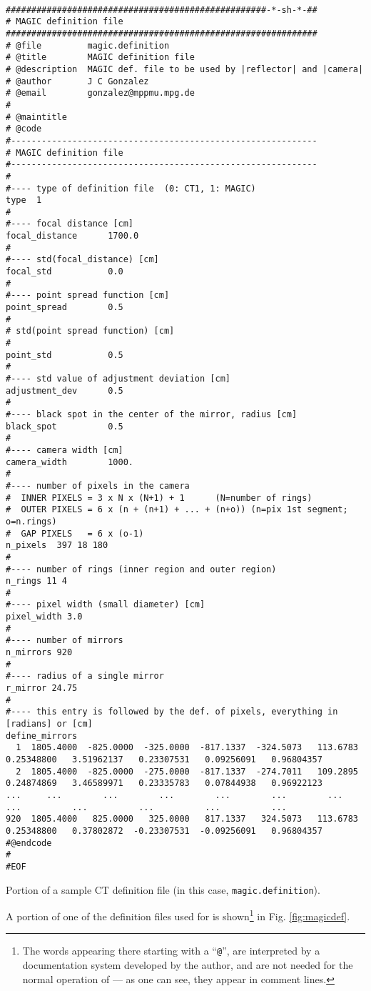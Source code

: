 \begin{listado}
  \tiny
\begin{verbatim}

###################################################-*-sh-*-##
# MAGIC definition file
#############################################################
# @file         magic.definition
# @title        MAGIC definition file
# @description  MAGIC def. file to be used by |reflector| and |camera|
# @author       J C Gonzalez
# @email        gonzalez@mppmu.mpg.de
#
# @maintitle
# @code
#------------------------------------------------------------ 
# MAGIC definition file
#------------------------------------------------------------
#
#---- type of definition file  (0: CT1, 1: MAGIC)
type  1
#
#---- focal distance [cm]
focal_distance      1700.0
#
#---- std(focal_distance) [cm]
focal_std           0.0
#
#---- point spread function [cm]
point_spread        0.5
#
# std(point spread function) [cm]
#
point_std           0.5
#
#---- std value of adjustment deviation [cm]
adjustment_dev      0.5
#
#---- black spot in the center of the mirror, radius [cm]
black_spot          0.5
#
#---- camera width [cm]
camera_width        1000.
#
#---- number of pixels in the camera 
#  INNER PIXELS = 3 x N x (N+1) + 1      (N=number of rings)
#  OUTER PIXELS = 6 x (n + (n+1) + ... + (n+o)) (n=pix 1st segment; o=n.rings)
#  GAP PIXELS   = 6 x (o-1)
n_pixels  397 18 180 
#
#---- number of rings (inner region and outer region)
n_rings 11 4 
#
#---- pixel width (small diameter) [cm] 
pixel_width 3.0
#
#---- number of mirrors
n_mirrors 920
#
#---- radius of a single mirror
r_mirror 24.75
#
#---- this entry is followed by the def. of pixels, everything in [radians] or [cm]
define_mirrors
  1  1805.4000  -825.0000  -325.0000  -817.1337  -324.5073   113.6783   0.25348800   3.51962137   0.23307531   0.09256091   0.96804357
  2  1805.4000  -825.0000  -275.0000  -817.1337  -274.7011   109.2895   0.24874869   3.46589971   0.23335783   0.07844938   0.96922123
...     ...        ...        ...        ...        ...        ...        ...          ...          ...          ...          ...
920  1805.4000   825.0000   325.0000   817.1337   324.5073   113.6783   0.25348800   0.37802872  -0.23307531  -0.09256091   0.96804357
#@endcode
#
#EOF
\end{verbatim}
  \caption{Portion of a sample CT definition file (in this case, 
    \texttt{magic.definition}).}
  \label{fig:magicdef}
\end{listado}

A portion of one of the definition files used for \MAGIC is
shown\footnote{The words appearing there starting with a
  ``\texttt{@}'', are interpreted by a documentation system developed
  by the author, and are not needed for the normal operation of
   --- as one can see, they appear in comment lines.} in
Fig. \ref{fig:magicdef}. 

